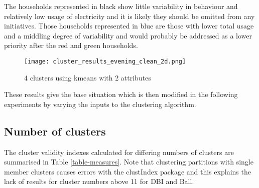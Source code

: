 \documentclass[conference]{IEEEtran}
\begin{document}
The households represented in black show little variability in behaviour and relatively low usage of electricity and it is likely they should be omitted from any initiatives. Those households represented in blue are those with lower total usage and a middling degree of variability and would probably be addressed as a lower priority after the red and green households.

\begin{figure}[h]
\centering
\texttt{[image: cluster\_results\_evening\_clean\_2d.png]}
\caption{4 clusters using kmeans with 2 attributes}
\label{2dclusters}
\end{figure}

These results give the base situation which is then modified in the following experiments by varying the inputs to the clustering algorithm.

\subsection{Number of clusters}

The cluster validity indexes calculated for differing numbers of clusters are summarised in Table \ref{table-measures}. Note that clustering partitions with single member clusters causes errors with the clustIndex package and this explains the lack of results for cluster numbers above 11 for DBI and Ball.
\end{document}

